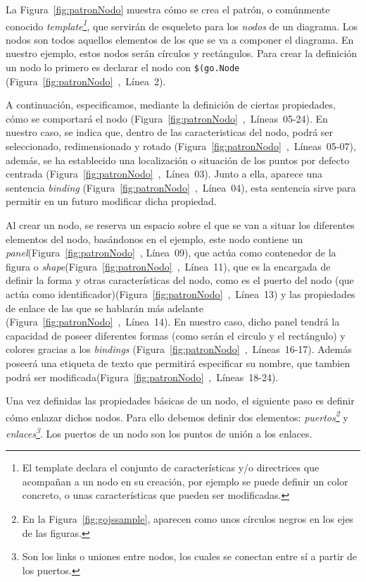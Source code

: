 La Figura~\ref{fig:patronNodo} muestra cómo se crea el patrón, o comúnmente conocido \emph{template\footnote{El template declara el conjunto de características y/o directrices que acompañan a un nodo en su creación, por ejemplo se puede definir un color concreto, o unas características que pueden ser modificadas.}}, que servirán de esqueleto para los \emph{nodos} de un diagrama. Los nodos son todos aquellos elementos de los que se va a componer el diagrama. En nuestro ejemplo, estos nodos serán círculos y rectángulos. Para crear la definición un nodo lo primero es declarar el nodo con \texttt{\$(go.Node} (Figura~\ref{fig:patronNodo}~,~Línea~2). 

A continuación, especificamos, mediante la definición de ciertas propiedades, cómo se comportará el nodo (Figura~\ref{fig:patronNodo}~,~Líneas~05-24). En nuestro caso, se indica que, dentro de las caracteristicas del nodo, podrá ser seleccionado, redimensionado y rotado (Figura~\ref{fig:patronNodo}~,~Líneas~05-07), además, se ha establecido una localización o situación de los puntos por defecto centrada (Figura~\ref{fig:patronNodo}~,~Línea~03). Junto a ella, aparece una sentencia  \emph{binding} (Figura~\ref{fig:patronNodo}~,~Línea~04), esta sentencia sirve para permitir en un futuro modificar dicha propiedad.

Al crear un nodo, se reserva un espacio sobre el que se van a situar los diferentes elementos del nodo, basándonos en el ejemplo, este nodo contiene un \emph{panel}(Figura~\ref{fig:patronNodo}~, Línea~09), que actúa como contenedor de la figura o \emph{shape}(Figura~\ref{fig:patronNodo}~,~Línea~11), que es la encargada de definir la forma y otras características del nodo, como es el puerto del nodo (que actúa como identificador)(Figura~\ref{fig:patronNodo}~,~Línea~13) y las propiedades de enlace de las que se hablarán más adelante (Figura~\ref{fig:patronNodo}~,~Línea~14). En nuestro caso, dicho panel tendrá la capacidad de poseer diferentes formas (como serán el circulo y el rectángulo) y colores gracias a los \emph{bindings} (Figura~\ref{fig:patronNodo}~,~Líneas~16-17). Además poseerá una etiqueta de texto que permitirá especificar su nombre, que tambien podrá ser modificada(Figura~\ref{fig:patronNodo}~,~Líneas~18-24).

Una vez definidas las propiedades básicas de un nodo, el siguiente paso es definir cómo enlazar dichos nodos. Para ello debemos definir dos elementos: \emph{puertos\footnote{En la Figura~\ref{fig:gojssample}, aparecen como unos círculos negros en los ejes de las figuras.}} y \emph{enlaces\footnote{Son los links o uniones entre nodos, los cuales se conectan entre sí a partir de los puertos.}}. Los puertos de un nodo son los puntos de unión a los enlaces. 

